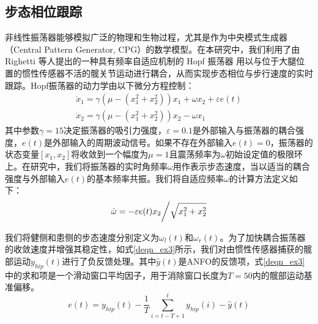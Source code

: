 \subsection{步态相位跟踪} 
非线性振荡器能够模拟广泛的物理和生物过程，尤其是作为中央模式生成器（Central Pattern Generator, CPG）的数学模型。在本研究中，我们利用了由 Righetti 等人提出的一种具有频率自适应机制的 Hopf 振荡器 \cite{righettiDynamicHebbianLearning2006a}用以与位于大腿位置的惯性传感器不活的髋关节运动进行耦合，从而实现步态相位与步行速度的实时跟踪。Hopf振荡器的动力学由以下微分方程控制：
\begin{equation}
\label{deqn_ex1}
\begin{array}{*{20}{l}}
{{{\dot x}_1} = \gamma \left( {\mu  - \left( {x_1^2 + x_2^2} \right)} \right){x_1} + \omega {x_2} + \varepsilon e(t)}  \\  
{{{\dot x}_2} = \gamma \left( {\mu  - \left( {x_1^2 + x_2^2} \right)} \right){x_2} - \omega {x_1}} 
\end{array}
\end{equation}   
其中参数$\gamma= 15$决定振荡器的吸引力强度，$\varepsilon  = 0.1$是外部输入与振荡器的耦合强度，$e(t)$是外部输入的周期波动信号。如果不存在外部输入$e(t)=0$，振荡器的状态变量$[{x_1},{x_2}]$将收敛到一个幅度为$\mu=1$且震荡频率为$\omega$初始设定值的极限环上。在研究中，我们将振荡器的实时角频率$\omega$用作表示步态速度，当以适当的耦合强度与外部输入$e(t)$的基本频率共振。我们将自适应频率$\omega$的计算方法定义如下：
\begin{equation}
\label{deqn_ex2}
\dot \omega  = {{ - \varepsilon e(t){x_2}} \mathord{\left/
{\vphantom {{ - \varepsilon e(t){x_2}} {\sqrt {x_1^2 + x_2^2} }}} \right.
\kern-\nulldelimiterspace} {\sqrt {x_1^2 + x_2^2} }}
\end{equation}    

我们将健侧和患侧的步态速度分别定义为${\omega _l}(t)$和${\omega _r}(t)$。为了加快耦合振荡器的收敛速度并增强其稳定性，如式\ref{deqn_ex3}所示，我们对由惯性传感器捕获的髋部运动${y_{hip}}(t)$进行了负反馈处理。其中$\hat y(t)$是ANFO的反馈项，式\ref{deqn_ex3}中的求和项是一个滑动窗口平均因子，用于消除窗口长度为$T = 50$内的髋部运动基准偏移。
\begin{equation}
\label{deqn_ex3}
e(t) = {y_{hip}}(t) - \frac{1}{T}\sum\limits_{i = t - T + 1}^t {{y_{hip}}(i)}  - \hat y(t)
\end{equation}   

